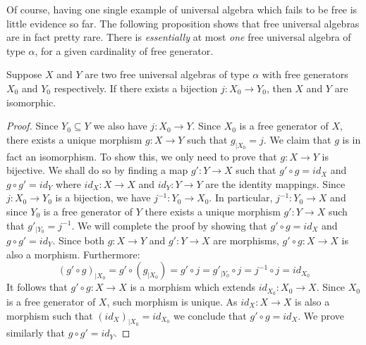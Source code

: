 Of course, having one single example of universal algebra which fails to be free
is little evidence so far. The following proposition shows that free universal
algebras are in fact pretty rare. There is {\em essentially} at most {\em one}
free universal algebra of type $\alpha$, for a given cardinality of free
generator. \begin{prop}\label{logic:prop:isomorphic} Suppose $X$ and $Y$ are two
free universal algebras of type $\alpha$ with free generators $X_{0}$ and $Y_{0}$
respectively. If there exists a bijection $j:X_{0}\to Y_{0}$, then $X$ and $Y$ are
isomorphic. \end{prop} \begin{proof} Since $Y_{0}\subseteq Y$ we also have
$j:X_{0}\to Y$. Since $X_{0}$ is a free generator of $X$, there exists a unique
morphism $g:X\to Y$ such that $g_{|X_{0}}=j$. We claim that $g$ is in fact an
isomorphism. To show this, we only need to prove that $g:X\to Y$ is bijective. We
shall do so by finding a map $g':Y\to X$ such that $g'\circ g = id_{X}$ and
$g\circ g'=id_{Y}$ where $id_{X}:X\to X$ and $id_{Y}:Y\to Y$ are the identity
mappings. Since $j:X_{0}\to Y_{0}$ is a bijection, we have $j^{-1}:Y_{0}\to
X_{0}$. In particular, $j^{-1}:Y_{0}\to X$ and since $Y_{0}$ is a free generator
of $Y$ there exists a unique morphism $g':Y\to X$ such that $g'_{|Y_{0}}=j^{-1}$.
We will complete the proof by showing that $g'\circ g = id_{X}$ and $g\circ
g'=id_{Y}$. Since both $g:X\to Y$ and $g':Y\to X$ are morphisms, $g'\circ g:X\to
X$ is also a morphism. Furthermore:
    \[
    (g'\circ g)_{|X_{0}}=g'\circ (g_{|X_{0}})=g'\circ j = g'_{|Y_{0}}\circ j =
    j^{-1}\circ j=id_{X_{0}}
    \]
It follows that $g'\circ g:X\to X$ is a morphism which extends
$id_{X_{0}}:X_{0}\to X$. Since $X_{0}$ is a free generator of $X$, such morphism
is unique. As $id_{X}:X\to X$ is also a morphism such that
$(id_{X})_{|X_{0}}=id_{X_{0}}$ we conclude that $g'\circ g=id_{X}$. We prove
similarly that $g\circ g'=id_{Y}$. \end{proof}
